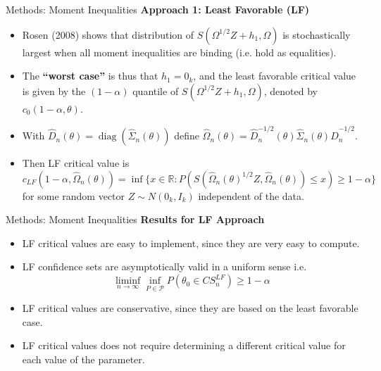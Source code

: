 \documentclass[aspectratio=169]{beamer}  %
\begin{document}
\begin{frame}{Methods: Moment Inequalities}
    \textbf{Approach 1: Least Favorable (LF)}
    \begin{itemize} 
        \item Rosen (2008) shows that distribution of $S(\Omega^{1/2}Z+h_1,\Omega)$ is stochastically largest when all moment inequalities are binding (i.e. hold as equalities).
        \item The \textbf{“worst case”} is thus that $h_1 = 0_k$, and the least favorable
        critical value is given by the $(1-\alpha)$ quantile of $S(\Omega^{1/2}Z+h_1,\Omega)$, denoted by $c_{0}(1-\alpha,\theta)$.
        \item With $\hat{D}_n(\theta)=\operatorname{diag}(\hat{\Sigma}_n(\theta))$ define $\hat{\Omega}_n(\theta)=\hat{D}_n^{-1/2}(\theta)\hat{\Sigma}_n(\theta)\hat{D}_n^{-1/2}$.
        \item Then LF critical value is $$c_{LF}(1-\alpha,\hat{\Omega}_n(\theta))=\inf\{x\in\mathbb{R}:P(S(\hat{\Omega}_n(\theta)^{1/2}Z,\hat{\Omega}_n(\theta))\leq x)\geq1-\alpha\}$$ for some random vector $Z\sim N(0_k,I_k)$ independent of the data.
    \end{itemize}
\end{frame}

\begin{frame}{Methods: Moment Inequalities}
    \textbf{Results for LF Approach} 
    \begin{itemize}
        \item LF critical values are easy to implement, since they are very easy to
        compute.
        \item LF confidence sets are asymptotically valid in a uniform sense i.e. $$\liminf_{n\to\infty}\inf_{P\in\mathscr{P}}P(\theta_0\in CS_n^{LF})\geq1-\alpha$$
        \item LF critical values are conservative, since they are based on the least
        favorable case.
        \item LF critical values does not require determining a different critical value for each value of the parameter.
    \end{itemize}
\end{frame}
\end{document}
